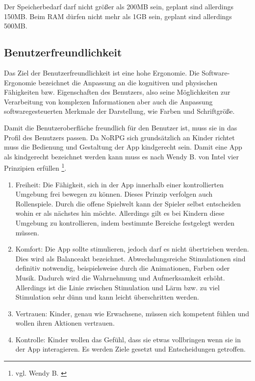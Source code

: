		Der Speicherbedarf darf nicht größer als 200MB sein, geplant sind allerdings 150MB. Beim RAM dürfen nicht mehr als 1GB sein, geplant sind allerdings 500MB.
	
	\subsection{Benutzerfreundlichkeit}
		Das Ziel der Benutzerfreundlichkeit ist eine hohe Ergonomie. Die Software-Ergonomie bezeichnet die Anpassung an die kognitiven und physischen Fähigkeiten bzw. Eigenschaften des Benutzers, also seine Möglichkeiten zur Verarbeitung von komplexen Informationen aber auch die Anpassung softwaregesteuerten Merkmale der Darstellung, wie Farben und Schriftgröße.
		
		Damit die Benutzeroberfläche freundlich für den Benutzer ist, muss sie in das Profil des Benutzers passen. Da NoRPG sich grundsätzlich an Kinder richtet muss die Bedienung und Gestaltung der App kindgerecht sein. Damit eine App als kindgerecht bezeichnet werden kann muss es nach Wendy B. von Intel vier Prinzipien erfüllen \footnote{vgl. Wendy B. \cite{intelKids}}.
		
		\begin{enumerate}
			\item{Freiheit: Die Fähigkeit, sich in der App innerhalb einer kontrollierten Umgebung frei bewegen zu können. Dieses Prinzip verfolgen auch Rollenspiele. Durch die offene Spielwelt kann der Spieler selbst entscheiden wohin er als nächstes hin möchte. Allerdings gilt es bei Kindern diese Umgebung zu kontrollieren, indem bestimmte Bereiche festgelegt werden müssen.}
			\item{Komfort: Die App sollte stimulieren, jedoch darf es nicht übertrieben werden. Dies wird als Balanceakt bezeichnet. Abwechslungsreiche Stimulationen sind definitiv notwendig, beispielsweise durch die Animationen, Farben oder Musik. Dadurch wird die Wahrnehmung und Aufmerksamkeit erhöht. Allerdings ist die Linie zwischen Stimulation und Lärm bzw. zu viel Stimulation sehr dünn und kann leicht überschritten werden.}
			\item{Vertrauen: Kinder, genau wie Erwachsene, müssen sich kompetent fühlen und wollen ihren Aktionen vertrauen.}
			\item{Kontrolle: Kinder wollen das Gefühl, dass sie etwas vollbringen wenn sie in der App interagieren. Es werden Ziele gesetzt und Entscheidungen getroffen.}
		\end{enumerate}
	
